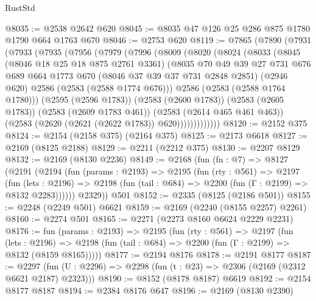 \begin{lexlean}{RustStd}
\begin{coremodule}
{\begin{coremodule}
{{{{{{{{{{{{{{{@8035 := @2538 @2642 @620
@8045 := @8035 @47 @126 @25 @286 @875 @1780 @1790 @664 @1763 @670
@8046 := @2753 @620
@8119 := @7865
    (@7890
      (@7931
        (@7933
          (@7935
            (@7956
              (@7979
                (@7996
                  (@8009
                    (@8020
                      (@8024
                        (@8033
                          (@8045
                            (@8046 @18 @25 @18 @875 @2761 @3361)
                            (@8035
                              @70
                              @49
                              @39
                              @27
                              @731
                              @676
                              @689
                              @664
                              @1773
                              @670
                              (@8046 @37 @39 @37 @731 @2848 @2851)
                              (@2946 @620)
                              @2586
                              (@2583 (@2588 @1774 @676)))
                            @2586
                            (@2583 (@2588 @1764 @1780)))
                          (@2595 (@2596 @1783))
                          (@2583 (@2600 @1783))
                          (@2583 (@2605 @1783))
                          (@2583 (@2609 @1783 @461))
                          (@2583 (@2614 @465 @461 @463))
                          (@2583 (@2620 (@2621 (@2622 @1783)) @620)))))))))))))
@8120 := @2152 @375
@8124 := @2154 (@2158 @375) (@2164 @375)
@8125 := @2173 @6618
@8127 := @2169 (@8125 @2188)
@8129 := @2211 (@2212 @375)
@8130 := @2207 @8129
@8132 := @2169 (@8130 @2236)
@8149 := @2168
    (fun (fn : @7) =>
    @8127
      (@2191
        (@2194
          (fun (params : @2193) =>
          @2195
            (fun (rty : @561) =>
            @2197
              (fun (lets : @2196) =>
              @2198 (fun (tail : @684) => @2200 (fun (Γ : @2199) => @8132 @2283))))))
        @2329))
    @501
@8152 := @2335 (@8125 (@2186 @501))
@8155 := @2248 (@2249 @501) @6621
@8159 := @2169 (@2240 (@8155 @2257) @2261)
@8160 := @2274 @501
@8165 := @2271 (@2273 @8160 @6624 @2229 @2231)
@8176 := fun (params : @2193) =>
  @2195
    (fun (rty : @561) =>
    @2197
      (fun (lets : @2196) =>
      @2198 (fun (tail : @684) => @2200 (fun (Γ : @2199) => @8132 (@8159 @8165)))))
@8177 := @2194 @8176
@8178 := @2191 @8177
@8187 := @2297 (fun (U : @2296) => @2298 (fun (t : @23) => @2306 (@2169 (@2312 @6621 @2187) @2323)))
@8190 := @8152 (@8178 @8187) @6619
@8192 := @2154 @8177 @8187
@8194 := @2384 @8176 @647
@8196 := @2169 (@8130 @2390)
}}}}}}}}}}}}}}}
\end{coremodule}}
\end{coremodule}
\end{lexlean}
